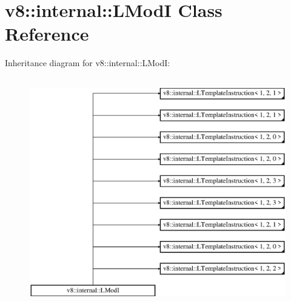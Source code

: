 \hypertarget{classv8_1_1internal_1_1_l_mod_i}{}\section{v8\+:\+:internal\+:\+:L\+ModI Class Reference}
\label{classv8_1_1internal_1_1_l_mod_i}
Inheritance diagram for v8\+:\+:internal\+:\+:L\+ModI\+:\begin{figure}[H]
\begin{center}
\leavevmode
\includegraphics[height=10.000000cm]{classv8_1_1internal_1_1_l_mod_i}
\end{center}
\end{figure}

